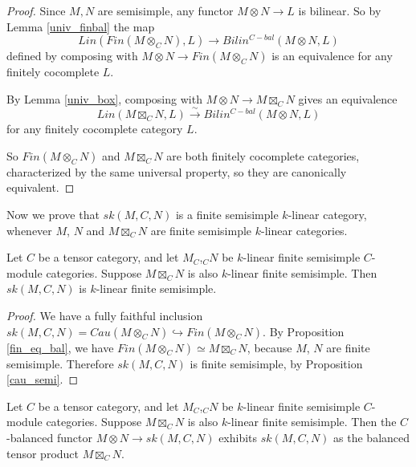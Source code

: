 \begin{proof}

  Since $M,N$ are semisimple, any functor $M\otimes N\to L$ is bilinear. So by
  Lemma \ref{univ_finbal} the map \[Lin(Fin(M \otimes_{C} N), L) \to
  Bilin^{C-bal}(M \otimes N, L)\] defined by composing with $M\otimes N\to
  Fin(M\otimes_C N)$ is an equivalence for any finitely cocomplete $L$.

  By Lemma \ref{univ_box}, composing with $M\otimes N\to M\boxtimes_C N$ gives
  an equivalence \[Lin(M \boxtimes_{C} N, L) \xrightarrow{\sim}
  Bilin^{C-bal}(M \otimes N, L)\] for any finitely cocomplete category $L$.

  So $Fin(M\otimes_C N)$ and $M \boxtimes_{C} N$ are both finitely cocomplete
  categories, characterized by the same universal property, so they are
  canonically equivalent.
\end{proof}

Now we prove that $sk(M,C,N)$ is a finite semisimple $k$-linear category,
whenever $M$, $N$ and $M\boxtimes_C N$ are finite semisimple $k$-linear
categories.

\begin{lemma}\label{semisimple}
  Let $C$ be a tensor category, and let $M_C$,$_{C}N$ be $k$-linear finite
  semisimple $C$-module categories. Suppose $M\boxtimes_C N$ is also
  $k$-linear finite semisimple.
  Then $sk(M,C,N)$ is $k$-linear finite
  semisimple.
\end{lemma}

\begin{proof}
  We have a fully faithful inclusion $sk(M,C,N)=Cau(M\otimes_C
  N)\hookrightarrow Fin(M\otimes_C N)$. By Proposition \ref{fin_eq_bal}, we
  have $Fin(M\otimes_C N)\simeq M\boxtimes_C N$, because $M$, $N$ are finite
  semisimple. Therefore $sk(M,C,N)$ is finite semisimple, by
  Proposition \ref{cau_semi}.
\end{proof}

\begin{lemma}\label{sk_bal}
  Let $C$ be a tensor category, and let $M_C$,$_{C}N$ be $k$-linear finite
  semisimple $C$-module categories. Suppose $M\boxtimes_C N$ is also
  $k$-linear finite semisimple. Then the $C$-balanced functor $M\otimes N\to
  sk(M,C,N)$ exhibits $sk(M,C,N)$ as the balanced tensor product $M\boxtimes_C
  N$.
\end{lemma}

